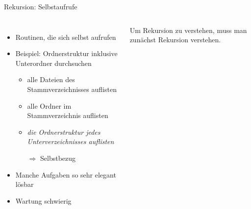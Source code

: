 \begin{frame}[t,fragile]{Rekursion: Selbstaufrufe}
%
\begin{columns}[T]
\begin{itemize}
\item Routinen, die sich selbst aufrufen
\item Beispiel: Ordnerstruktur inklusive Unterordner durchsuchen
	\begin{itemize}
	\item alle Dateien des Stammverzeichnisses auflisten
	\item alle Ordner im Stammverzeichnis auflisten
	\item \emph{die Ordnerstruktur jedes Unterverzeichnisses auflisten}
	\item[$\Rightarrow$] Selbstbezug
	\end{itemize}
\item Manche Aufgaben so sehr elegant lösbar
\item Wartung schwierig
\end{itemize}
%
\begin{hintbox}
\footnotesize Um Rekursion zu verstehen, muss man zunächst Rekursion verstehen.
\end{hintbox}
%
\vspace{-10pt}

\end{columns}
\end{frame}
